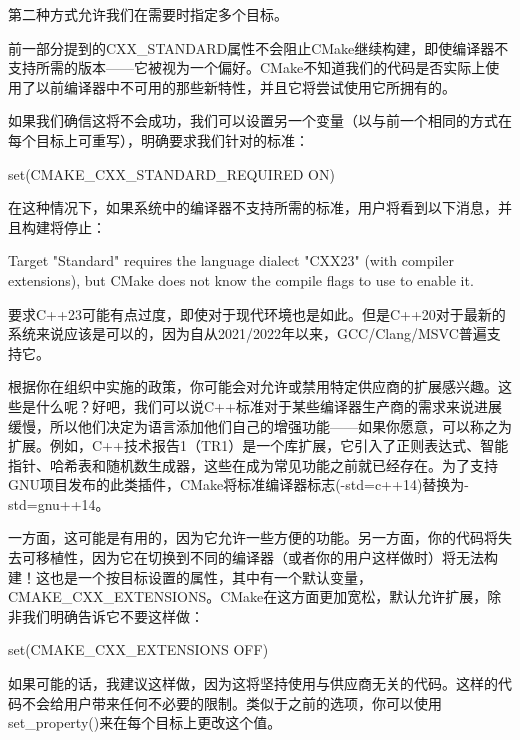 第二种方式允许我们在需要时指定多个目标。


前一部分提到的CXX\_STANDARD属性不会阻止CMake继续构建，即使编译器不支持所需的版本——它被视为一个偏好。CMake不知道我们的代码是否实际上使用了以前编译器中不可用的那些新特性，并且它将尝试使用它所拥有的。

如果我们确信这将不会成功，我们可以设置另一个变量（以与前一个相同的方式在每个目标上可重写），明确要求我们针对的标准：

\begin{cmake}
set(CMAKE_CXX_STANDARD_REQUIRED ON)
\end{cmake}

在这种情况下，如果系统中的编译器不支持所需的标准，用户将看到以下消息，并且构建将停止：

\begin{shell}
Target "Standard" requires the language dialect "CXX23" (with compiler extensions), but CMake does not know the compile flags to use to enable it.
\end{shell}

要求C++23可能有点过度，即使对于现代环境也是如此。但是C++20对于最新的系统来说应该是可以的，因为自从2021/2022年以来，GCC/Clang/MSVC普遍支持它。


根据你在组织中实施的政策，你可能会对允许或禁用特定供应商的扩展感兴趣。这些是什么呢？好吧，我们可以说C++标准对于某些编译器生产商的需求来说进展缓慢，所以他们决定为语言添加他们自己的增强功能——如果你愿意，可以称之为扩展。例如，C++技术报告1（TR1）是一个库扩展，它引入了正则表达式、智能指针、哈希表和随机数生成器，这些在成为常见功能之前就已经存在。为了支持GNU项目发布的此类插件，CMake将标准编译器标志(-std=c++14)替换为-std=gnu++14。

一方面，这可能是有用的，因为它允许一些方便的功能。另一方面，你的代码将失去可移植性，因为它在切换到不同的编译器（或者你的用户这样做时）将无法构建！这也是一个按目标设置的属性，其中有一个默认变量，CMAKE\_CXX\_EXTENSIONS。CMake在这方面更加宽松，默认允许扩展，除非我们明确告诉它不要这样做：

\begin{cmake}
set(CMAKE_CXX_EXTENSIONS OFF)
\end{cmake}

如果可能的话，我建议这样做，因为这将坚持使用与供应商无关的代码。这样的代码不会给用户带来任何不必要的限制。类似于之前的选项，你可以使用set\_property()来在每个目标上更改这个值。


